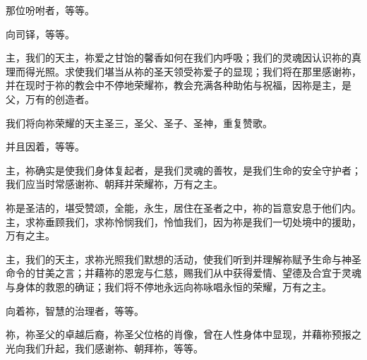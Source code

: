 那位吩咐者，等等。\par

向司铎，等等。\par

\par

主，我们的天主，祢爱之甘饴的馨香如何在我们内呼吸；我们的灵魂因认识祢的真理而得光照。求使我们堪当从祢的圣天领受祢爱子的显现；我们将在那里感谢祢，并在现时于祢的教会中不停地荣耀祢，教会充满各种助佑与祝福，因祢是主，是父，万有的创造者。\par

\par

我们将向祢荣耀的天主圣三，圣父、圣子、圣神，重复赞歌。\par

\par

并且因着，等等。\par

\par

主，祢确实是使我们身体复起者，是我们灵魂的善牧，是我们生命的安全守护者；我们应当时常感谢祢、朝拜并荣耀祢，万有之主。\par

\par

祢是圣洁的，堪受赞颂，全能，永生，居住在圣者之中，祢的旨意安息于他们内。主，求祢垂顾我们，求祢怜悯我们，怜恤我们，因为祢是我们一切处境中的援助，万有之主。\par

\par

主，我们的天主，求祢光照我们默想的活动，使我们听到并理解祢赋予生命与神圣命令的甘美之言；并藉祢的恩宠与仁慈，赐我们从中获得爱情、望德及合宜于灵魂与身体的救恩的确证；我们将不停地永远向祢咏唱永恒的荣耀，万有之主。\par

\par

向着祢，智慧的治理者，等等。\par

\par

祢，祢圣父的卓越后裔，祢圣父位格的肖像，曾在人性身体中显现，并藉祢预报之光向我们升起，我们感谢祢、朝拜祢，等等。\par

